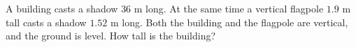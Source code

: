A building casts a shadow $36$ m long. At the same time a vertical flagpole $1.9$ m tall casts a shadow $1.52$ m long. Both the building and the flagpole are vertical, and the ground is level. How tall is the building?
